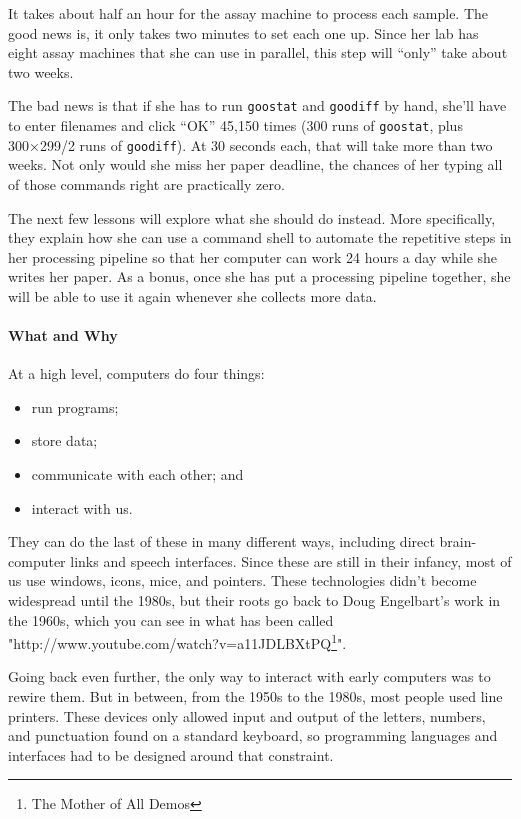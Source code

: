 \documentclass[]{book}
\newcommand{\urlfoot}[2]{{#1}\footnote{#2}}
\begin{document}
It takes about half an hour for the assay machine to process each
sample. The good news is, it only takes two minutes to set each one up.
Since her lab has eight assay machines that she can use in parallel,
this step will ``only'' take about two weeks.

The bad news is that if she has to run \texttt{goostat} and
\texttt{goodiff} by hand, she'll have to enter filenames and click
``OK'' 45,150 times (300 runs of \texttt{goostat}, plus 300×299/2 runs
of \texttt{goodiff}). At 30 seconds each, that will take more than two
weeks. Not only would she miss her paper deadline, the chances of her
typing all of those commands right are practically zero.

The next few lessons will explore what she should do instead. More
specifically, they explain how she can use a command shell to automate
the repetitive steps in her processing pipeline so that her computer can
work 24 hours a day while she writes her paper. As a bonus, once she has
put a processing pipeline together, she will be able to use it again
whenever she collects more data.

\mbox{}\paragraph{What and Why}

At a high level, computers do four things:

\begin{itemize}
\item
  run programs;
\item
  store data;
\item
  communicate with each other; and
\item
  interact with us.
\end{itemize}

They can do the last of these in many different ways, including direct
brain-computer links and speech interfaces. Since these are still in
their infancy, most of us use windows, icons, mice, and pointers. These
technologies didn't become widespread until the 1980s, but their roots
go back to Doug Engelbart's work in the 1960s, which you can see in what
has been called "\urlfoot{http://www.youtube.com/watch?v=a11JDLBXtPQ}{The
Mother of All Demos}".

Going back even further, the only way to interact with early computers
was to rewire them. But in between, from the 1950s to the 1980s, most
people used line printers. These devices only allowed input and output
of the letters, numbers, and punctuation found on a standard keyboard,
so programming languages and interfaces had to be designed around that
constraint.
\end{document}

